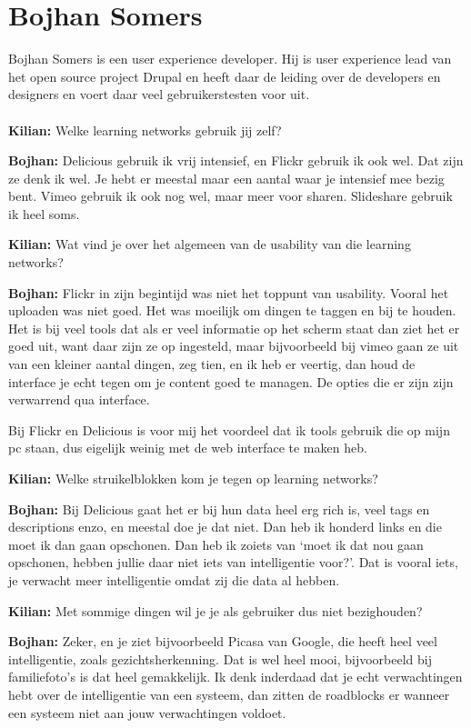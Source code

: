 \section{Bojhan Somers}
Bojhan Somers is een user experience developer. Hij is user experience lead van het open source project Drupal en heeft daar de leiding over de developers en designers en voert daar veel gebruikerstesten voor uit.

\paragraph{}
\textbf{Kilian:} Welke learning networks gebruik jij zelf?

\textbf{Bojhan:} Delicious gebruik ik vrij intensief, en Flickr gebruik ik ook wel. Dat zijn ze denk ik wel. Je hebt er meestal maar een aantal waar je intensief mee bezig bent. Vimeo gebruik ik ook nog wel, maar meer voor sharen. Slideshare gebruik ik heel soms.

\textbf{Kilian:} Wat vind je over het algemeen van de usability van die learning networks?

\textbf{Bojhan:} Flickr in zijn begintijd was niet het toppunt van usability. Vooral het uploaden was niet goed. Het was moeilijk om dingen te taggen en bij te houden. Het is bij veel tools dat als er veel informatie op het scherm staat dan ziet het er goed uit, want daar zijn ze op ingesteld, maar bijvoorbeeld bij vimeo gaan ze uit van een kleiner aantal dingen, zeg tien, en ik heb er veertig, dan houd de interface je echt tegen om je content goed te managen. De opties die er zijn zijn verwarrend qua interface.

Bij Flickr en Delicious is voor mij het voordeel dat ik tools gebruik die op mijn pc staan, dus eigelijk weinig met de web interface te maken heb.

\textbf{Kilian:} Welke struikelblokken kom je tegen op learning networks?

\textbf{Bojhan:} Bij Delicious gaat het er bij hun data heel erg rich is, veel tags en descriptions enzo, en meestal doe je dat niet. Dan heb ik honderd links en die moet ik dan gaan opschonen. Dan heb ik zoiets van `moet ik dat nou gaan opschonen, hebben jullie daar niet iets van intelligentie voor?'. Dat is vooral iets, je verwacht meer intelligentie omdat zij die data al hebben.

\textbf{Kilian:} Met sommige dingen wil je je als gebruiker dus niet bezighouden?

\textbf{Bojhan:} Zeker, en je ziet bijvoorbeeld Picasa van Google, die heeft heel veel intelligentie, zoals gezichtsherkenning. Dat is wel heel mooi, bijvoorbeeld bij familiefoto's is dat heel gemakkelijk. Ik denk inderdaad dat je echt verwachtingen hebt over de intelligentie van een systeem, dan zitten de roadblocks er wanneer een systeem niet aan jouw verwachtingen voldoet.


